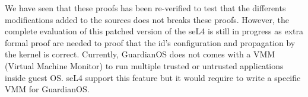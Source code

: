 \documentclass[conference]{IEEEtran}
\begin{document}
We have seen that these proofs has been re-verified to test that the differents modifications added to the sources does not breaks these proofs. However, the complete evaluation of this patched version of the seL4 is still in progress as extra formal proof are needed to proof that the id's configuration and propagation by the kernel is correct. 
Currently, GuardianOS does not comes with a VMM (Virtual Machine Monitor) to run multiple trusted or untrusted applications inside guest OS. seL4 support this feature but it would require to write a specific VMM for GuardianOS. 

\newpage
\printbibliography
\end{document}
